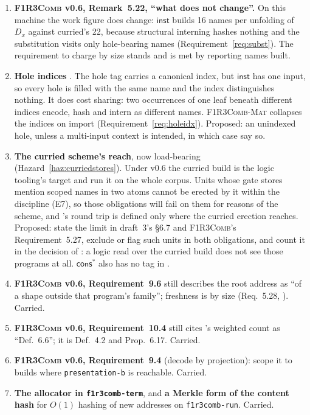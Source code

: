 \documentclass[11pt,a4paper]{article}
\newcommand{\code}[1]{\texttt{#1}}
\newcommand{\Comb}{\textsc{F1R3Comb}}
\newcommand{\Mat}{\textsc{F1R3Comb-Mat}}
\theoremstyle{definition}
\theoremstyle{plain}
\newcommand{\inst}{\mathsf{inst}}
\newcommand{\cstar}{\mathsf{cons}^{*}}
\begin{document}
\begin{enumerate}[leftmargin=1.8em]
\item \textbf{\Comb{} v0.6, Remark~5.22, ``what does not change''.} On this
machine the work figure does change: $\inst$ builds 16 names per unfolding of
$D_{x}$ against curried's 22, because structural interning hashes nothing and
the substitution visits only hole-bearing names (Requirement~\ref{req:subst}).
The requirement to charge by size \cite[Req.~5.25]{combspec} stands and is
met by reporting names built.

\item \textbf{Hole indices} \cite[Req.~5.24]{combspec}. The hole tag carries
a canonical index, but $\inst$ has one input, so every hole is filled with
the same name and the index distinguishes nothing. It does cost sharing: two
occurrences of one leaf beneath different indices encode, hash and intern as
different names. \Mat{} collapses the indices on import
(Requirement~\ref{req:holeidx}). Proposed: an unindexed hole, unless a
multi-input context is intended, in which case say so.

\item \textbf{The curried scheme's reach}, now load-bearing
(Hazard~\ref{haz:curriedstores}). Under v0.6 the curried build is the logic
tooling's target \cite[Req.~5.27]{combspec} and
\cite[Obl.~11.5, Obl.~11.6]{combspec} run it on the whole corpus. Units whose
gate stores mention scoped names in two atoms cannot be erected by it within
the discipline (E7), so those obligations will fail on them for reasons of the
scheme, and \cite[Obl.~11.6]{combspec}'s round trip is defined only where the
curried erection reaches. Proposed: state the limit in draft~3's \S6.7 and
\Comb's Requirement~5.27, exclude or flag such units in both obligations, and
count it in the decision of \cite[\S14, item~5]{combspec}: a logic read over
the curried build does not see those programs at all. $\cstar$ also has no
tag in \cite[Req.~4.11]{combspec}.

\item \textbf{\Comb{} v0.6, Requirement~9.6} still describes the root
address as ``of a shape outside that program's family''; freshness is by size
(Req.~5.28, \cite[Lem.~6.14]{draft3}). Carried.

\item \textbf{\Comb{} v0.6, Requirement~10.4} still cites \cite{logic}'s
weighted count as ``Def.~6.6''; it is Def.~4.2 and Prop.~6.17. Carried.

\item \textbf{\Comb{} v0.6, Requirement~9.4} (decode by projection): scope it
to builds where \code{presentation-b} is reachable. Carried.

\item \textbf{The allocator in \code{f1r3comb-term}}, and \textbf{a Merkle
form of the content hash} for $O(1)$ hashing of new addresses on
\code{f1r3comb-run}. Carried.

\end{enumerate}
\end{document}
